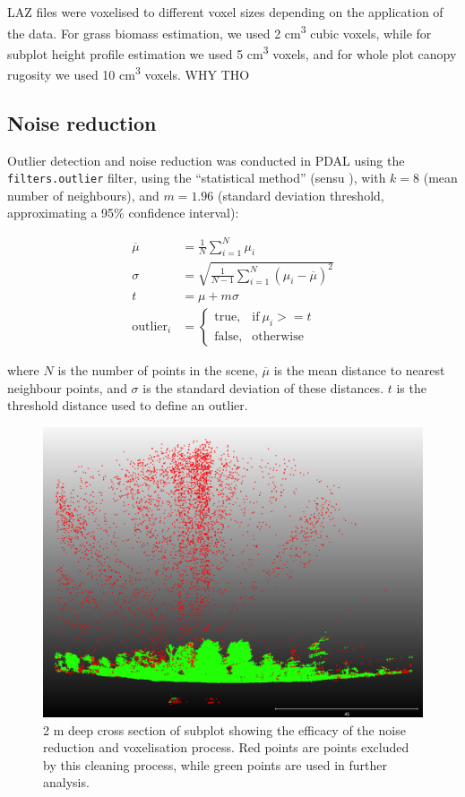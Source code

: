 \documentclass[11pt,a4paper]{article}
\begin{document}
LAZ files were voxelised to different voxel sizes depending on the application of the data. For grass biomass estimation, we used 2 cm\textsuperscript{3} cubic voxels, while for subplot height profile estimation we used 5 cm\textsuperscript{3} voxels, and for whole plot canopy rugosity we used 10 cm\textsuperscript{3} voxels. WHY THO

\subsection{Noise reduction}

Outlier detection and noise reduction was conducted in PDAL using the \texttt{filters.outlier} filter, using the ``statistical method'' (sensu \citealt{Rusu2008}), with $k = 8$ (mean number of neighbours), and $m = 1.96$ (standard deviation threshold, approximating a 95\% confidence interval):

\begin{align}
	\overline{\mu} &= \frac{1}{N} \sum_{i=1}^{N} \mu_{i} \\
	\sigma &= \sqrt{\frac{1}{N-1} \sum_{i=1}^{N}(\mu_{i} - \overline{\mu{}})^2} \\
	t &= \mu + m \sigma \\
	\text{outlier}_{i} &= 
		\begin{cases}
			\text{true}, & \text{if}\ \mu_{i} >= t \\
			\text{false}, & \text{otherwise}
		\end{cases}
\end{align}

where $N$ is the number of points in the scene, $\overline{\mu}$ is the mean distance to nearest neighbour points, and $\sigma$ is the standard deviation of these distances. $t$ is the threshold distance used to define an outlier.

\begin{figure}[H]
\centering
	\includegraphics[width=\textwidth]{noise_vis}
	\caption{2 m deep cross section of subplot showing the efficacy of the noise reduction and voxelisation process. Red points are points excluded by this cleaning process, while green points are used in further analysis.}
	\label{noise_vis}
\end{figure}
\end{document}
